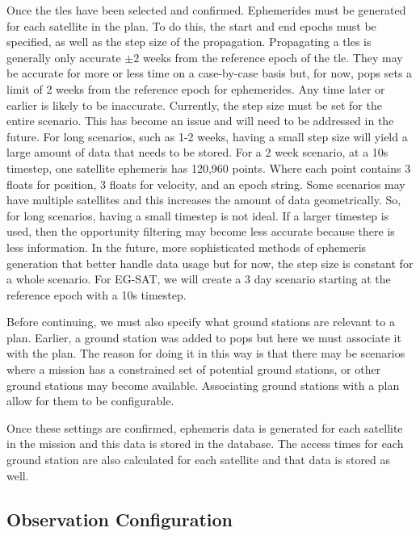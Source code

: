 Once the \glspl{tle} have been selected and confirmed. Ephemerides must be
generated for each satellite in the plan. To do this, the start and end epochs
must be specified, as well as the step size of the propagation. Propagating a
\glspl{tle} is generally only accurate $\pm 2$ weeks from the reference epoch
of the \gls{tle}. They may be accurate for more or less time on a case-by-case
basis but, for now, \gls{pops} sets a limit of 2 weeks from the reference epoch
for ephemerides. Any time later or earlier is likely to be inaccurate.
Currently, the step size must be set for the entire scenario. This has become
an issue and will need to be addressed in the future. For long scenarios, such
as 1-2 weeks, having a small step size will yield a large amount of data that
needs to be stored. For a 2 week scenario, at a 10s timestep, one satellite
ephemeris has 120,960 points.  Where each point contains 3 floats for position,
3 floats for velocity, and an epoch string. Some scenarios may have multiple
satellites and this increases the amount of data geometrically. So, for long
scenarios, having a small timestep is not ideal. If a larger timestep is used,
then the opportunity filtering may become less accurate because there is less
information. In the future, more sophisticated methods of ephemeris generation
that better handle data usage but for now, the step size is constant for a
whole scenario. For EG-SAT, we will create a 3 day scenario starting at the
reference epoch with a 10s timestep. 

Before continuing, we must also specify what ground stations are relevant to a
plan. Earlier, a ground station was added to \gls{pops} but here we must
associate it with the plan. The reason for doing it in this way is that there
may be scenarios where a mission has a constrained set of potential ground
stations, or other ground stations may become available. Associating ground
stations with a plan allow for them to be configurable. 

Once these settings are confirmed, ephemeris data is generated for each
satellite in the mission and this data is stored in the database. The access
times for each ground station are also calculated for each satellite and that
data is stored as well.


\subsection{Observation Configuration}



